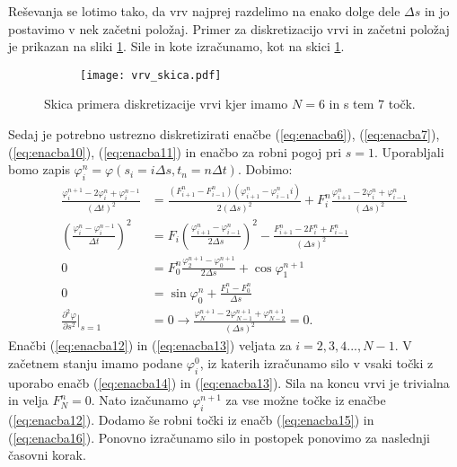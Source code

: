 \documentclass[12pt,a4paper]{article}
\begin{document}
Reševanja se lotimo tako, da vrv najprej razdelimo na enako dolge dele $\Delta s$ in jo postavimo v nek začetni položaj. Primer za diskretizacijo vrvi in začetni položaj je prikazan na sliki \ref{fig:slika1}. Sile in kote izračunamo, kot na skici \ref{fig:slika1}.

\begin{figure}[H]
    \centering
    \begin{subfigure}[b]{0.35\textwidth}  			
        \texttt{[image: vrv\_skica.pdf]}
    \end{subfigure}
    \caption{Skica primera diskretizacije vrvi kjer imamo $N=6$ in s tem 7 točk.} \label{fig:slika1}
\end{figure}

\noindent Sedaj je potrebno ustrezno diskretizirati enačbe  (\ref{eq:enacba6}), (\ref{eq:enacba7}), (\ref{eq:enacba10}), (\ref{eq:enacba11}) in enačbo za robni pogoj pri $s=1$. Uporabljali bomo zapis $\varphi ^{n} _i = \varphi (s_i=i\Delta s ,t_n=n \Delta t)$. Dobimo:
\begin{align}
\frac{\varphi ^{n+1} _i - 2\varphi ^{n} _i + \varphi ^{n-1} _i}{(\Delta t)^{2}}&= \frac{(F^{n}_{i+1} - F^{n}_{i-1})(\varphi ^{n}_{i+1} - \varphi^{n}_{i-1}i )}{2 (\Delta s)^{2}} + F_i ^{n} \frac{\varphi ^{n} _{i+1} -2\varphi ^{n} _{i} +\varphi ^{n} _{i-1}}{(\Delta s)^{2}} \label{eq:enacba12} \\
\left(\frac{\varphi ^{n}_i - \varphi ^{n-1}_i}{\Delta t}\right)^{2} &= F_i \left(\frac{\varphi _{i+1} ^{n} - \varphi ^{n} _{i-1}}{2\Delta s} \right) ^{2} - \frac{F^{n} _{i+1} - 2F_i ^{n} + F^{n} _{i-1}}{(\Delta s) ^{2}} \label{eq:enacba13} \\
0&=F_0 ^{n} \frac{\varphi _2 ^{n+1} - \varphi_0 ^{n+1}}{2 \Delta s} + \cos \varphi _1 ^{n+1} \label{eq:enacba14} \\
0&= \sin \varphi _0 ^{n} + \frac{F_1 ^{n} -F_0 ^{n}}{\Delta s} \label{eq:enacba15} \\
\frac{\partial ^{2} \varphi}{\partial s^{2}} \Big|_{s=1}&=0 \rightarrow \frac{\varphi ^{n+1} _N - 2\varphi ^{n+1} _{N-1} + \varphi ^{n+1}_ {N-2}}{(\Delta s)^{2}}=0. \label{eq:enacba16}
\end{align}
Enačbi (\ref{eq:enacba12}) in (\ref{eq:enacba13}) veljata za $i = 2,3,4...,N-1$. V začetnem stanju imamo podane $\varphi_i ^{0}$, iz katerih izračunamo silo v vsaki točki z uporabo enačb (\ref{eq:enacba14}) in (\ref{eq:enacba13}). Sila na koncu vrvi je trivialna in velja $F^{n} _N =0$. Nato izačunamo $\varphi _i ^{n+1}$ za vse možne točke iz enačbe (\ref{eq:enacba12}). Dodamo še robni točki iz enačb (\ref{eq:enacba15}) in (\ref{eq:enacba16}). Ponovno izračunamo silo in postopek ponovimo za naslednji časovni korak.
\end{document}
